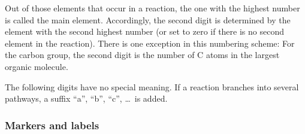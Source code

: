 \documentclass[twoside]{article}
\begin{document}
Out of those elements that occur in a reaction, the one with the highest
number is called the main element. Accordingly, the second digit is
determined by the element with the second highest number (or set to zero
if there is no second element in the reaction). There is one exception
in this numbering scheme: For the carbon group, the second digit is the
number of C atoms in the largest organic molecule.

The following digits have no special meaning. If a reaction branches
into several pathways, a suffix ``a'', ``b'', ``c'', \dots\ is added.

\subsubsection{Markers and labels}
\label{sec:markerslabels}
\end{document}
